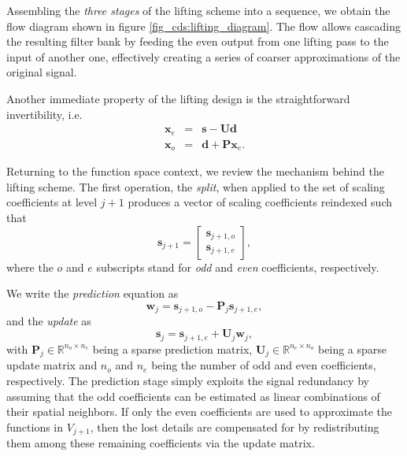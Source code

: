 \documentclass[graybox]{svmult}
\begin{document}
	Assembling the \emph{three stages} of the lifting scheme into a sequence, we obtain the flow diagram shown in figure \ref{fig_cds:lifting_diagram}. The flow allows cascading the resulting filter bank by feeding the even output from one lifting pass to the input of another one, effectively creating a series of coarser approximations of the original signal.
	
	Another immediate property of the lifting design is the straightforward invertibility, i.e.
	\begin{eqnarray}
	\mathbf{x}_e &=& \mathbf{s} - \mathbf{Ud} \\
	\mathbf{x}_o &=& \mathbf{d} + \mathbf{P}\mathbf{x}_e.
	\end{eqnarray}
	
	Returning to the function space context, we review the mechanism behind the lifting scheme. The first operation, the \emph{split}, when applied to the set of scaling coefficients at level $j+1$ produces a vector of scaling coefficients reindexed such that
	\begin{equation}
	\mathbf{s}_{j+1} = \begin{bmatrix} \mathbf{s}_{j+1,o} \\ \mathbf{s}_{j+1,e} \end{bmatrix},
	\label{eq_cds:lifting_splitting}
	\end{equation}
	where the $o$ and $e$ subscripts stand for \emph{odd} and \emph{even} coefficients, respectively. 
	
	We write the \emph{prediction} equation as
	\begin{equation}
	\mathbf{w}_j = \mathbf{s}_{j+1,o} - \mathbf{P}_j \mathbf{s}_{j+1,e},
	\label{eq_cds:coeff_predict}
	\end{equation}
	and the \emph{update} as
	\begin{equation}
	\mathbf{s}_j = \mathbf{s}_{j+1,e} + \mathbf{U}_j \mathbf{w}_j,
	\label{eq_cds:coeff_update}
	\end{equation}
	with $\mathbf{P}_j \in \mathbb{R}^{n_o \times n_e}$ being a sparse prediction matrix, $\mathbf{U}_j \in \mathbb{R}^{n_e \times n_o}$ being a sparse update matrix and $n_o$ and $n_e$ being the number of odd and even coefficients, respectively. The prediction stage simply exploits the signal redundancy by assuming that the odd coefficients can be estimated as linear combinations of their spatial neighbors. If only the even coefficients are used to approximate the functions in $V_{j+1}$, then the lost details are compensated for by redistributing them among these remaining coefficients via the update matrix. 
	
\end{document}
